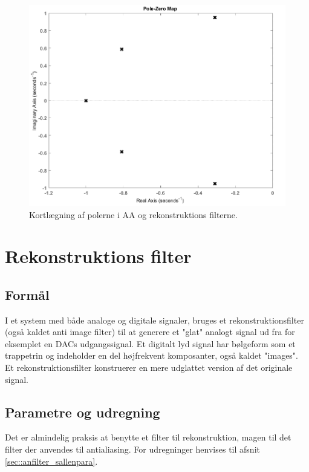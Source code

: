 \begin{figure}[h!]
	\centering
	\includegraphics[scale = 0.4]{./billeder/pzmap}
	\caption{Kortlægning af polerne i AA og rekonstruktions filterne.}
	\label{fig:afilter_pol}
\end{figure}
\FloatBlock
\section{Rekonstruktions filter}
\subsection{Formål}
I et system med både analoge og digitale signaler, bruges et rekonstruktionsfilter (også kaldet anti image filter) til at generere et "glat" analogt signal ud fra for eksemplet en DACs udgangssignal. Et digitalt lyd signal har bølgeform som et trappetrin og indeholder en del højfrekvent komposanter, også kaldet "images". Et rekonstruktionsfilter konstruerer en mere udglattet version af det originale signal.
\subsection{Parametre og udregning}
Det er almindelig praksis at benytte et filter til rekonstruktion, magen til det filter der anvendes til antialiasing. For udregninger henvises til afsnit \ref{sec::anfilter_sallenpara}.

